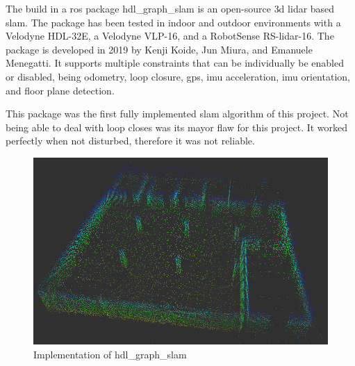 The build in a \acs{ros} package \mbox{hdl\_graph\_slam} is an open\hyp{}source \acs{3d} \acs{lidar} based \acs{slam}. The package has been tested in indoor and outdoor environments with a Velodyne HDL\hyp{}32E, a Velodyne VLP\hyp{}16, and a RobotSense RS\hyp{}\acs{lidar}\hyp{}16. The package is developed in 2019 by Kenji Koide, Jun Miura, and Emanuele Menegatti. It supports multiple constraints that can be individually be enabled or disabled, being odometry, loop closure, \acs{gps}, \acs{imu} acceleration, \acs{imu} orientation, and floor plane detection. \cite{koide2019portable}

This package was the first fully implemented \acs{slam} algorithm of this project. Not being able to deal with loop closes was its mayor flaw for this project. It worked perfectly when not disturbed, therefore it was not reliable.

\begin{figure}[!h]
  \centering
  \includegraphics[width=\linewidth]{images/hdl_graph_slam_implementation.png}
  \caption{Implementation of hdl\_graph\_slam}
  \label{fig:hdl_graph_slam_implementation}
\end{figure}